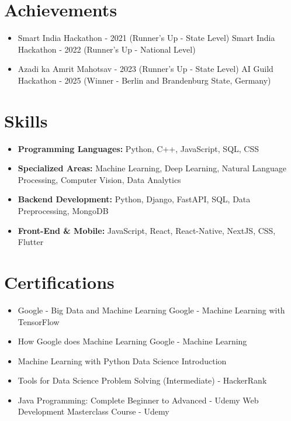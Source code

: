 \documentclass[a4paper,10pt]{article}
\begin{document}
\section*{Achievements}
\begin{itemize}
\item Smart India Hackathon - 2021 (Runner's Up - State Level) \hfill Smart India Hackathon - 2022 (Runner's Up - National Level)
\item Azadi ka Amrit Mahotsav - 2023 (Runner's Up - State Level) \hfill AI Guild Hackathon - 2025 (Winner - Berlin and Brandenburg State, Germany)
\end{itemize}

\section*{Skills}
\begin{itemize}
  \item \textbf{Programming Languages:} Python, C++, JavaScript, SQL, CSS
  \item \textbf{Specialized Areas:} Machine Learning, Deep Learning, Natural Language Processing, Computer Vision, Data Analytics
  \item \textbf{Backend Development:} Python, Django, FastAPI, SQL, Data Preprocessing, MongoDB
  \item \textbf{Front-End \& Mobile:} JavaScript, React, React-Native, NextJS, CSS, Flutter
\end{itemize}

\section*{Certifications}
\begin{itemize}
\item Google - Big Data and Machine Learning \hfill Google - Machine Learning with TensorFlow
\item How Google does Machine Learning \hfill Google - Machine Learning
\item Machine Learning with Python \hfill Data Science Introduction
\item Tools for Data Science \hfill Problem Solving (Intermediate) - HackerRank
\item Java Programming: Complete Beginner to Advanced - Udemy \hfill Web Development Masterclass Course - Udemy
\end{itemize}
\end{document}
